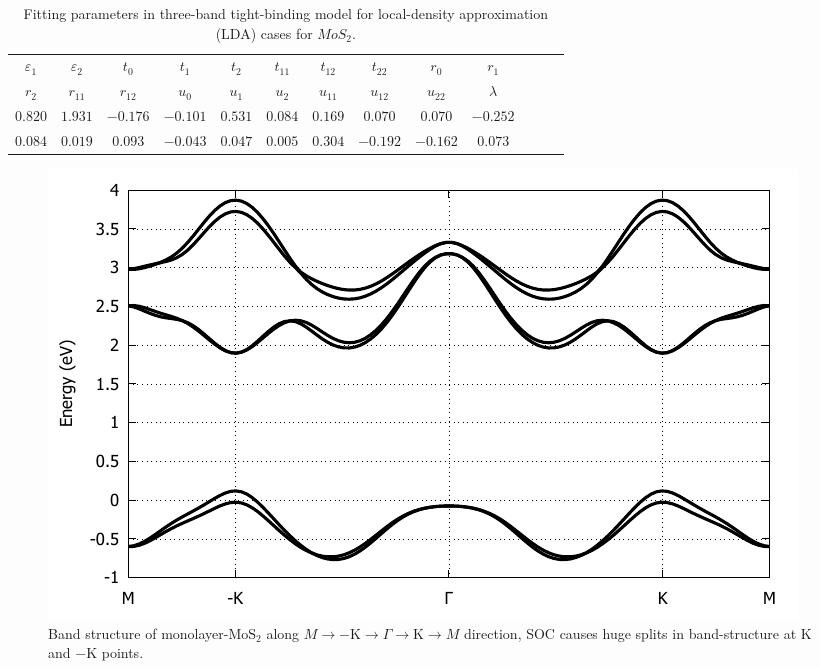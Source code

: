 \documentclass[12pt,english,a4paper]{article}
\begin{document}
\begin{table}[]
	\begin{center}
		\begin{tabular}{c c c c c c c c c c c c c} 
			\hline
			\hline
				$\varepsilon_1$&$\varepsilon_2$&$t_0$&$t_1$&$t_2$&$t_{11}$&$t_{12}$&$t_{22}$&$r_0$&$r_{1}$&\\
				$r_2$&$r_{11}$&$r_{12}$&$u_{0}$&$u_{1}$& $u_{2}$&$u_{11}$&$u_{12}$&$u_{22}$&$\lambda$\\
				\hline
				$0.820$ & $1.931$ & $-0.176$ & $-0.101$ & $0.531$ & $0.084$ & $0.169$ & $0.070$ & $0.070$ & $-0.252$ \\ $0.084$ & $0.019$ & $0.093$ & $-0.043$ & $0.047$ & $0.005$ & $0.304$ & $-0.192$ & $-0.162$ &$0.073$  \\
				\hline
				\hline 
		\end{tabular}
	\caption[Fitting parameters in three-band tight-binding model for $MoS_2$]{Fitting parameters in three-band tight-binding model for local-density approximation (LDA) cases for $MoS_2$.\cite{liu_three-band_2013}}
		\label{3TB Para}
	\end{center}
\end{table}
	\begin{figure}
		\begin{center}
			\includegraphics[width= 0.8\linewidth]{Images/BS.pdf}
\caption[Band structure of $\mathrm{MoS}_2$ material along $M\to -\mathrm{K} \to \Gamma \to \mathrm{K}\to M$ direction]{Band structure of monolayer-$\mathrm{MoS}_2$ along $M\to -\mathrm{K} \to \Gamma \to \mathrm{K}\to M$ direction, SOC causes huge splits in band-structure at $\mathrm{K}$ and $-\mathrm{K}$ points.}
			\label{BS}
		\end{center}
	\end{figure}
 	\newpage
\end{document}
